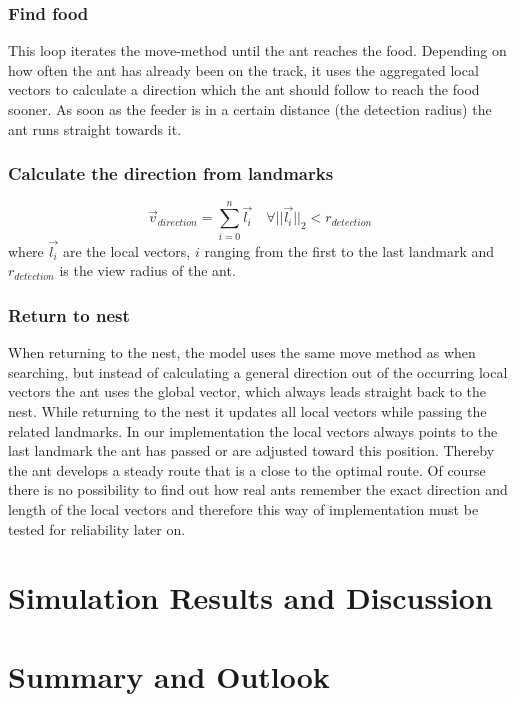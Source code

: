 \documentclass[11pt]{article}
\begin{document}
\subsubsection{Find food} This loop iterates the move-method until the ant reaches the food. Depending on how often the ant has already been on the track, it uses the aggregated local vectors to calculate a direction which the ant should follow to reach the food sooner. As soon as the feeder is in a certain distance (the detection radius) the ant runs straight towards it.

\subsubsection{Calculate the direction from landmarks}
\begin{equation}
	\vec{v}_{direction} = \sum_{i=0}^{n}\vec{l_i} \quad \forall ||\vec{l_i}||_2 < r_{detection}
\end{equation}
where $\vec{l_i}$ are the local vectors, $i$ ranging from the first to the last landmark and $r_{detection}$ is the view radius of the ant.

\subsubsection{Return to nest}
When returning to the nest, the model uses the same move method as when 	searching, but instead of calculating a general direction out of the occurring local vectors the ant uses the global vector, which always leads straight back to the nest. While returning to the nest it updates all local vectors while passing the related landmarks. In our implementation the local vectors always points to the last landmark the ant has passed or are adjusted toward this position. Thereby the ant develops a steady route that is a close to the optimal route. Of course there is no possibility to find out how real ants remember the exact direction and length of the local vectors and therefore this way of implementation must be tested for reliability later on.
\section{Simulation Results and Discussion}

\section{Summary and Outlook}

\appendix
\end{document}
